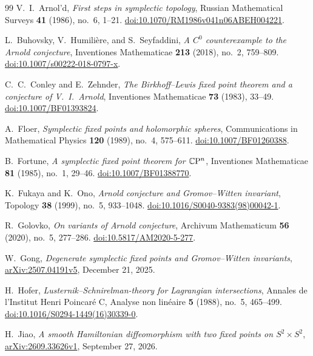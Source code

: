 \begin{thebibliography}{99}
V.~I.~Arnol'd,
\emph{First steps in symplectic topology},
Russian Mathematical Surveys \textbf{41} (1986), no.~6, 1--21.
\href{https://doi.org/10.1070/RM1986v041n06ABEH004221}{doi:10.1070/RM1986v041n06ABEH004221}.

L.~Buhovsky, V.~Humili\`ere, and S.~Seyfaddini,
\emph{A $C^0$ counterexample to the Arnold conjecture},
Inventiones Mathematicae \textbf{213} (2018), no.~2, 759--809.
\href{https://doi.org/10.1007/s00222-018-0797-x}{doi:10.1007/s00222-018-0797-x}.

C.~C.~Conley and E.~Zehnder,
\emph{The Birkhoff--Lewis fixed point theorem and a conjecture of V.~I.~Arnold},
Inventiones Mathematicae \textbf{73} (1983), 33--49.
\href{https://doi.org/10.1007/BF01393824}{doi:10.1007/BF01393824}.

A.~Floer,
\emph{Symplectic fixed points and holomorphic spheres},
Communications in Mathematical Physics \textbf{120} (1989), no.~4, 575--611.
\href{https://doi.org/10.1007/BF01260388}{doi:10.1007/BF01260388}.

B.~Fortune,
\emph{A symplectic fixed point theorem for $\mathbb C\mathrm P^n$},
Inventiones Mathematicae \textbf{81} (1985), no.~1, 29--46.
\href{https://doi.org/10.1007/BF01388770}{doi:10.1007/BF01388770}.

K.~Fukaya and K.~Ono,
\emph{Arnold conjecture and Gromov--Witten invariant},
Topology \textbf{38} (1999), no.~5, 933--1048.
\href{https://doi.org/10.1016/S0040-9383(98)00042-1}{doi:10.1016/S0040-9383(98)00042-1}.

R.~Golovko,
\emph{On variants of Arnold conjecture},
Archivum Mathematicum \textbf{56} (2020), no.~5, 277--286.
\href{https://doi.org/10.5817/AM2020-5-277}{doi:10.5817/AM2020-5-277}.

W.~Gong,
\emph{Degenerate symplectic fixed points and Gromov--Witten invariants},
\href{https://arxiv.org/abs/2507.04191v5}{arXiv:2507.04191v5}, December 21, 2025.

H.~Hofer,
\emph{Lusternik--Schnirelman-theory for Lagrangian intersections},
Annales de l'Institut Henri Poincar\'e C, Analyse non lin\'eaire
\textbf{5} (1988), no.~5, 465--499.
\href{https://doi.org/10.1016/S0294-1449(16)30339-0}{doi:10.1016/S0294-1449(16)30339-0}.

H.~Jiao,
\emph{A smooth Hamiltonian diffeomorphism with two fixed points on
$S^2\times S^2$},
\href{https://arxiv.org/abs/2609.33626v1}{arXiv:2609.33626v1}, September 27, 2026.


\end{thebibliography}
